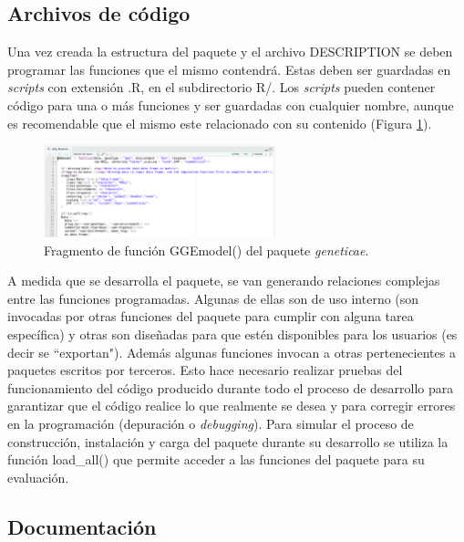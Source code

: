 \subsection{Archivos de código}

Una vez creada la estructura del paquete y el archivo DESCRIPTION se deben programar las funciones que el mismo contendrá. Estas deben ser guardadas en \emph{scripts} con extensión .R, en el subdirectorio R/. Los \emph{scripts} pueden contener código para una o más funciones y ser guardadas con cualquier nombre, aunque es recomendable que el mismo este relacionado con su contenido  (Figura \ref{fig:fig34}).

\begin{figure}[H]
	\begin{center}
		\includegraphics[width=0.60\textwidth]{./Graficos/GGEMODELFUNCTION.png}	
	\end{center}
	\caption{Fragmento de función \textcolor{fandango}{GGEmodel()} del paquete \emph{geneticae}.}
	\label{fig:fig34}
\end{figure}


A medida que se desarrolla el paquete, se van generando relaciones complejas entre las funciones programadas. Algunas de ellas son de uso interno (son invocadas por otras funciones del paquete para cumplir con alguna tarea específica) y otras son diseñadas para que estén disponibles para los usuarios (es decir se ``exportan"). Además algunas funciones invocan a otras pertenecientes a paquetes escritos por terceros. Esto hace necesario realizar pruebas del funcionamiento del código  producido durante todo el proceso de desarrollo para garantizar que el código realice lo que realmente se desea y para corregir errores en la programación (depuración o \emph{debugging}). Para simular el proceso de construcción, instalación y carga del paquete durante su desarrollo se utiliza la función 
\textcolor{fandango}{load\_all()} que permite acceder a las funciones del paquete para su evaluación.


\subsection{Documentación}

